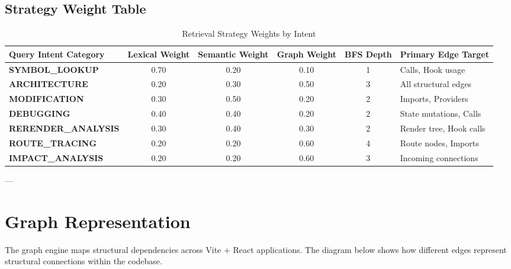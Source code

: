 \documentclass[11pt,a4paper]{article}
\begin{document}
\subsection{Strategy Weight Table}
\begin{table}[h!]
\centering
\begin{tabular}{lccccl}
\toprule
\bfseries Query Intent Category & \bfseries Lexical Weight & \bfseries Semantic Weight & \bfseries Graph Weight & \bfseries BFS Depth & \bfseries Primary Edge Target \\
\midrule
\rowcolor{lightbg}
\textbf{SYMBOL\_LOOKUP} & 0.70 & 0.20 & 0.10 & 1 & Calls, Hook usage \\
\textbf{ARCHITECTURE} & 0.20 & 0.30 & 0.50 & 3 & All structural edges \\
\rowcolor{lightbg}
\textbf{MODIFICATION} & 0.30 & 0.50 & 0.20 & 2 & Imports, Providers \\
\textbf{DEBUGGING} & 0.40 & 0.40 & 0.20 & 2 & State mutations, Calls \\
\rowcolor{lightbg}
\textbf{RERENDER\_ANALYSIS} & 0.30 & 0.40 & 0.30 & 2 & Render tree, Hook calls \\
\textbf{ROUTE\_TRACING} & 0.20 & 0.20 & 0.60 & 4 & Route nodes, Imports \\
\rowcolor{lightbg}
\textbf{IMPACT\_ANALYSIS} & 0.20 & 0.20 & 0.60 & 3 & Incoming connections \\
\bottomrule
\end{tabular}
\caption{Retrieval Strategy Weights by Intent}
\end{table}

---

\section{Graph Representation}
The graph engine maps structural dependencies across Vite + React applications. The diagram below shows how different edges represent structural connections within the codebase.
\end{document}
